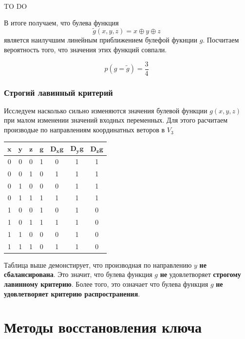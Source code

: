 \documentclass[a4paper,12pt]{article}
\theoremstyle{definition}
\begin{document}
	TO DO

	В итоге получаем, что булева функция	
	\[ \tilde{g}(x,y,z) = x \oplus y \oplus z \]
	является наилучшим линейным приближением булефой фукнции $g$. Посчитаем вероятность того, что значения этих функций совпали.
	
	\[ p(g=\tilde{g}) = \frac{3}{4} \]
	
	\subsubsection{Строгий лавинный критерий}
	
	Исследуем насколько сильно изменяются значения булевой функции $g(x, y, z)$ при малом изменении значений входных переменных. Для этого расчитаем производые по направлениям координатных веторов в $V_3$
	
	
	\begin{table}[h!]
		\begin{center}
			\begin{tabular}{|c|c|c||c||c|c|c|}
				\hline
				$ \pmb{x} $ & $ \pmb{y} $ & $ \pmb{z} $ & $ \pmb{g} $ & $ \pmb{D_x g} $ & $ \pmb{D_y g} $ & $ \pmb{D_z g} $ \\ \hline
				0 & 0 & 0 & 1 & 0 & 1 & 1 \\ \hline
				0 & 0 & 1 & 0 & 1 & 1 & 1 \\ \hline
				0 & 1 & 0 & 0 & 0 & 1 & 1 \\ \hline
				0 & 1 & 1 & 1 & 1 & 1 & 1 \\ \hline
				1 & 0 & 0 & 1 & 0 & 1 & 0 \\ \hline
				1 & 0 & 1 & 1 & 1 & 1 & 0 \\ \hline
				1 & 1 & 0 & 0 & 0 & 1 & 0 \\ \hline
				1 & 1 & 1 & 0 & 1 & 1 & 0 \\ \hline
			\end{tabular}
		\end{center}
	\end{table}
	
	
	Таблица выше демонстирует, что производная по направлению $y$ \textbf{не сбалансирована}. Это значит, что булева функция $g$ \textbf{не} удовлетворяет \textbf{строгому лавинному критерию}. Более того, это означает что булева функция $g$ \textbf{не удовлетворяет критерию распространения}.
	
	\section{Методы восстановления ключа}
	
\end{document}
